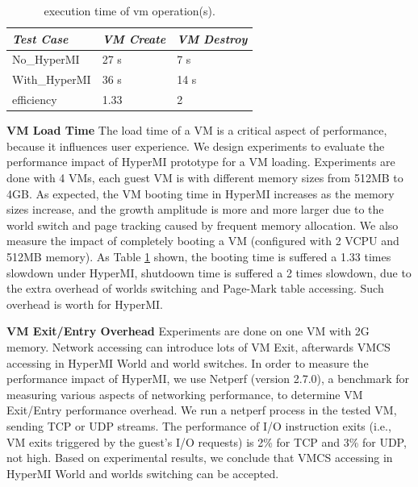 \documentclass[conference]{IEEEtran}
\begin{document}
\begin{table}
\centering
\caption{execution time of vm operation(s).}\label{tabvm}
\begin{tabular}{p{2cm}|p{1.4cm}|p{1.5cm}}
\hline
{\itshape\bfseries  Test Case} & {\itshape\bfseries VM Create} & {\itshape\bfseries VM Destroy} \\
\hline
No\_HyperMI & 27 s &  7 s\\
\hline
With\_HyperMI & 36 s & 14 s\\ 
\hline
efficiency & 1.33 & 2 \\
\hline
\end{tabular}
\end{table}


\textbf {VM Load Time}
The load time of a VM is a critical aspect of performance, because it influences user experience. We design experiments to evaluate the performance impact of HyperMI prototype for a VM loading. Experiments are done with 4 VMs, each guest VM is with different memory sizes from 512MB to 4GB.
 As expected, the VM booting time in HyperMI increases as the memory sizes increase, and the growth amplitude is more and more larger due to the world switch and page tracking caused by frequent memory allocation. We also measure the impact of completely booting a VM (configured with 2 VCPU and 512MB memory). As Table \ref{tabvm} shown, the booting time is suffered a 1.33 times slowdown under HyperMI, shutdoown time is suffered a 2 times slowdown, due to the extra overhead of worlds switching and Page-Mark table accessing. Such overhead is worth for HyperMI.

\textbf {VM Exit/Entry Overhead}
Experiments are done on one VM with 2G memory. Network accessing can introduce lots of VM Exit, afterwards VMCS accessing in HyperMI World and world switches. In order to measure the performance impact of HyperMI, we use Netperf (version 2.7.0), a benchmark for measuring various aspects of networking performance, to determine VM Exit/Entry performance overhead. We run a netperf process in the tested VM, sending TCP or UDP streams. The performance of I/O instruction exits (i.e., VM exits triggered by the guest's I/O requests) is 2\% for TCP and 3\% for UDP, not high. 
Based on experimental results, we conclude that VMCS accessing in HyperMI World and worlds switching can be accepted.
\end{document}
